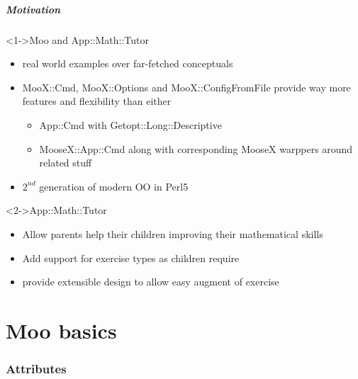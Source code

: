 \documentclass[ngerman,xcolor={table,dvipsnames},scriptsizeer,compress,hyperref={bookmarks,colorlinks}]{beamer}
\begin{document}
\begin{frame}[fragile]
\frametitle{Motivation}

\begin{block}<1->{Moo and App::Math::Tutor}
\begin{itemize}
\item real world examples over far-fetched conceptuals
\item MooX::Cmd, MooX::Options and MooX::ConfigFromFile provide way more features and flexibility than either
      \begin{itemize}
      \item App::Cmd with Getopt::Long::Descriptive
      \item MooseX::App::Cmd along with corresponding MooseX warppers around related stuff
      \end{itemize}
\item $ 2^{nd} $ generation of modern OO in Perl5
\end{itemize}
\end{block}

\begin{block}<2->{App::Math::Tutor}
\begin{itemize}
\item Allow parents help their children improving their mathematical skills
\item Add support for exercise types as children require
\item provide extensible design to allow easy augment of exercise
\end{itemize}
\end{block}

\end{frame}

\part{Moo basics}

\section{Attributes}
\end{document}
